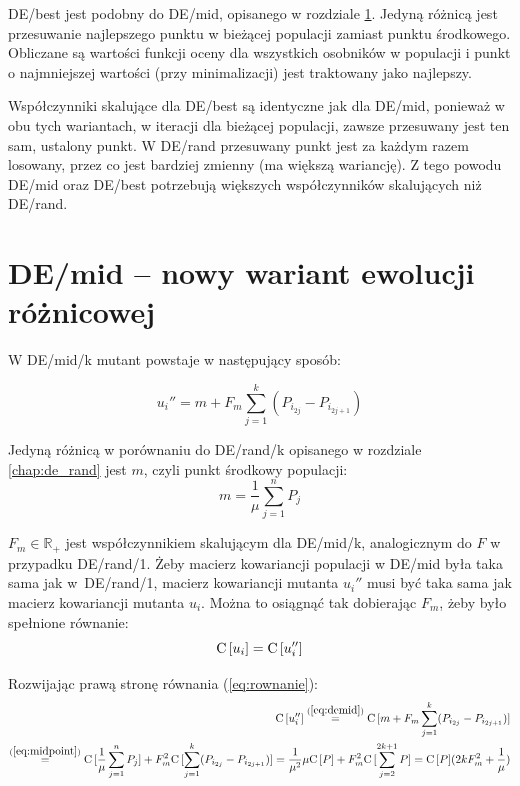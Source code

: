 \documentclass[a4paper,onecolumn,oneside,12pt,wide,floatssmall]{mwrep}
\def\C{{\rm C}\,}
\theoremstyle{definition}
\theoremstyle{plain}%
\theoremstyle{remark}
\begin{document}
DE/best jest podobny do DE/mid, opisanego w rozdziale \ref{chap:de_mid}. 
Jedyną różnicą jest przesuwanie najlepszego punktu
w bieżącej populacji zamiast punktu środkowego. Obliczane są wartości
funkcji oceny dla wszystkich osobników w populacji i punkt o najmniejszej wartości (przy minimalizacji)
jest traktowany jako najlepszy.

Współczynniki skalujące dla DE/best są identyczne jak dla DE/mid, ponieważ w obu tych wariantach,
w iteracji dla bieżącej populacji, zawsze przesuwany jest ten sam, ustalony punkt. W DE/rand
przesuwany punkt jest za każdym razem losowany, przez co jest bardziej zmienny (ma większą wariancję).
Z tego powodu DE/mid oraz DE/best potrzebują większych współczynników skalujących niż DE/rand.

\section{DE/mid -- nowy wariant ewolucji różnicowej}
\label{chap:de_mid}

W DE/mid/k mutant powstaje w następujący sposób:

\begin{equation} \label{eq:demid}
u_i'' = m + F_m\sum\limits_{j=1}^k (P_{i_{2j}} - P_{i_{2j+1}})
\end{equation}

Jedyną różnicą w porównaniu do DE/rand/k opisanego w rozdziale \ref{chap:de_rand} jest $m$, czyli punkt środkowy populacji:
\begin{equation} \label{eq:midpoint}
m = \frac{1}{\mu}\sum\limits_{j=1}^n P_j
\end{equation}

$F_m\in\mathbb{R_+}$ jest współczynnikiem skalującym dla DE/mid/k, analogicznym do $F$ 
w przypadku DE/rand/1. 
Żeby macierz kowariancji populacji w DE/mid była taka sama jak w~DE/rand/1, 
macierz kowariancji mutanta $u_i''$ musi być taka sama jak macierz kowariancji mutanta $u_i$.
Można to osiągnąć tak dobierając $F_m$, żeby było spełnione równanie:
\begin{equation} \label{eq:rownanie}
\C[u_i] = \C[u_i'']
\end{equation}

Rozwijając prawą stronę równania (\ref{eq:rownanie}):
\begin{align*}
\C[u_i''] \overset{(\ref{eq:demid})}{=} \C[m + F_m\sum\limits_{j=1}^k (P_{i_{2j}} - P_{i_{2j+1}})] \\
\overset{(\ref{eq:midpoint})}{=} \C[\frac{1}{\mu}\sum\limits_{j=1}^n P_j] + F_m^2\C[\sum\limits_{j=1}^k (P_{i_{2j}} - P_{i_{2j+1}})] 
= \frac{1}{\mu^2}\mu\C[P] + F_m^2\C[\sum\limits_{j=2}^{2k+1} P] = \C[P](2kF_m^2 + \frac{1}{\mu})
\end{align*}
\end{document}
